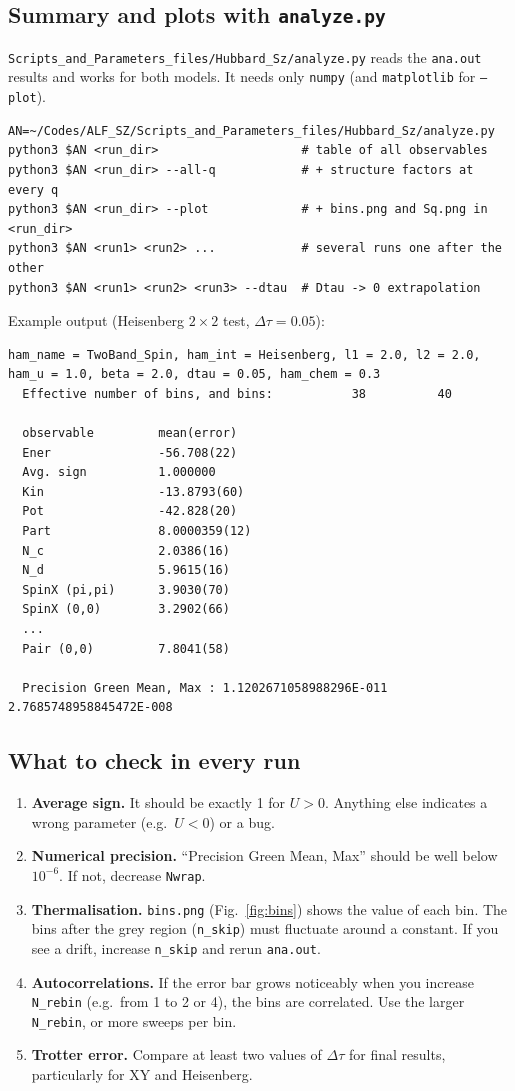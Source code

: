 \documentclass[11pt,a4paper]{article}
\newcommand{\f}[1]{\texttt{#1}}          %
\begin{document}
\subsection{Summary and plots with \texorpdfstring{\texttt{analyze.py}}{analyze.py}}
\f{Scripts\_and\_Parameters\_files/Hubbard\_Sz/analyze.py} reads the \f{ana.out} results and
works for both models. It needs only \f{numpy} (and \f{matplotlib} for \f{--plot}).
\begin{lstlisting}
AN=~/Codes/ALF_SZ/Scripts_and_Parameters_files/Hubbard_Sz/analyze.py
python3 $AN <run_dir>                    # table of all observables
python3 $AN <run_dir> --all-q            # + structure factors at every q
python3 $AN <run_dir> --plot             # + bins.png and Sq.png in <run_dir>
python3 $AN <run1> <run2> ...            # several runs one after the other
python3 $AN <run1> <run2> <run3> --dtau  # Dtau -> 0 extrapolation
\end{lstlisting}
Example output (Heisenberg $2\times2$ test, $\Delta\tau=0.05$):
\begin{lstlisting}[basicstyle=\ttfamily\scriptsize]
  ham_name = TwoBand_Spin, ham_int = Heisenberg, l1 = 2.0, l2 = 2.0, ham_u = 1.0, beta = 2.0, dtau = 0.05, ham_chem = 0.3
  Effective number of bins, and bins:           38          40

  observable         mean(error)
  Ener               -56.708(22)
  Avg. sign          1.000000
  Kin                -13.8793(60)
  Pot                -42.828(20)
  Part               8.0000359(12)
  N_c                2.0386(16)
  N_d                5.9615(16)
  SpinX (pi,pi)      3.9030(70)
  SpinX (0,0)        3.2902(66)
  ...
  Pair (0,0)         7.8041(58)

  Precision Green Mean, Max : 1.1202671058988296E-011 2.7685748958845472E-008
\end{lstlisting}

\subsection{What to check in every run}
\begin{enumerate}
  \item \textbf{Average sign.} It should be exactly 1 for $U>0$. Anything else indicates a
        wrong parameter (e.g.\ $U<0$) or a bug.
  \item \textbf{Numerical precision.} ``Precision Green Mean, Max'' should be well below
        $10^{-6}$. If not, decrease \f{Nwrap}.
  \item \textbf{Thermalisation.} \f{bins.png} (Fig.~\ref{fig:bins}) shows the value of each bin.
        The bins after the grey region (\f{n\_skip}) must fluctuate around a constant. If you
        see a drift, increase \f{n\_skip} and rerun \f{ana.out}.
  \item \textbf{Autocorrelations.} If the error bar grows noticeably when you increase
        \f{N\_rebin} (e.g.\ from 1 to 2 or 4), the bins are correlated. Use the larger
        \f{N\_rebin}, or more sweeps per bin.
  \item \textbf{Trotter error.} Compare at least two values of $\Delta\tau$ for final results,
        particularly for XY and Heisenberg.
\end{enumerate}
\end{document}
